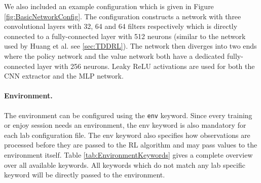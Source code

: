 We also included an example configuration which is given in Figure \ref{fig:BasicNetworkConfig}. The configuration constructs a network with three convolutional layers with 32, 64 and 64 filters respectively which is directly connected to a fully-connected layer with 512 neurons (similar to the network used by Huang et al. see \ref{sec:TDDRL}). The network then diverges into two ends where the policy network and the value network both have a dedicated fully-connected layer with 256 neurons. Leaky ReLU activations are used for both the CNN extractor and the MLP network.


\paragraph{Environment.} The environment can be configured using the \texttt{env} keyword. Since every training or enjoy session needs an environment, the env keyword is also mandatory for each lab configuration file. The env keyword also specifies how observations are processed before they are passed to the RL algorithm and may pass values to the environment itself. Table \ref{tab:EnvironmentKeywords} gives a complete overview over all available keywords. All keywords which do not match any lab specific keyword will be directly passed to the environment.


